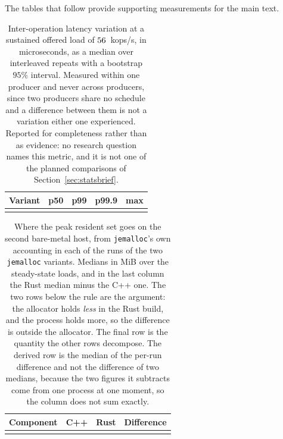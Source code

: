 \documentclass[english,oneside,a4paper,censored,csm,software-track-2020]{HYthesisML}
\begin{document}
\begin{appendices}
The tables that follow provide supporting measurements for the main text.

\begin{table}[ht]
\centering
\small
\caption[How much the delay changes from one call to the next]{Inter-operation latency variation at a
sustained offered load of $56$~kops/s, in microseconds, as a median over \NRepeats{}
interleaved repeats with a bootstrap $95\%$ interval. Measured within one producer and never across
producers, since two producers share no schedule and a difference between them is not a variation
either one experienced. Reported for completeness rather than as evidence: no research question
names this metric, and it is not one of the planned comparisons of
Section~\ref{sec:statsbrief}.\label{tab:jitter}}
\begin{tabular}{@{}l r r r r@{}}
\hline\hline
Variant & p50 & p99 & p99.9 & max \\
\hline
\\
\hline
\end{tabular}
\end{table}

\begin{table}[ht]
\centering
\small
\caption[Where the process's extra memory sits]{Where the peak resident set goes on the
second bare-metal host, from \texttt{jemalloc}'s own accounting in each of the \BmJeRuns{} runs of
the two \texttt{jemalloc} variants. Medians in MiB over the steady-state loads, and in the last column the Rust
median minus the C++ one. The two rows below the rule are the argument: the allocator holds
\emph{less} in the Rust build, and the process holds more, so the difference is outside the
allocator. The final row is the quantity the other rows decompose. The derived row is the median of
the per-run difference and not the difference of two medians, because the two figures it subtracts
come from one process at one moment, so the column does not sum
exactly.\label{tab:resident}}
\begin{tabular}{@{}l r r r@{}}
\hline\hline
Component & C++ & Rust & Difference \\
\hline
\\
\hline
\end{tabular}
\end{table}


\end{appendices}
\end{document}
